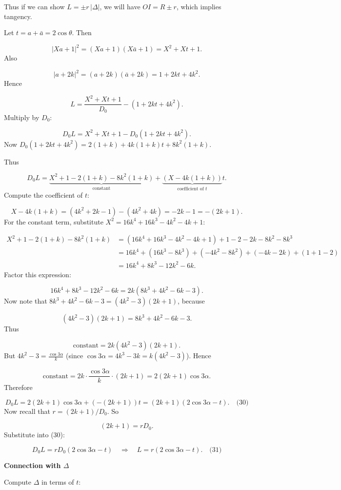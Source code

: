 \documentclass{llmxive}
\providecommand{\solutionheading}[1]{\par\smallskip\noindent\textbf{#1}\par}
\begin{document}
Thus if we can show \(L = \pm r\,|\Delta|\), we will have \(OI = R \pm r\), which implies tangency.\par
Let \(t = a + \bar a = 2\cos\theta\). Then\par
\[
|X a + 1|^2 = (X a + 1)(X \bar a + 1) = X^2 + X t + 1.
\]
Also\par
\[
|a+2k|^2 = (a+2k)(\bar a+2k) = 1 + 2k t + 4k^2.
\]
Hence\par
\[
L = \frac{X^2 + X t + 1}{D_0} - (1 + 2k t + 4k^2).
\]
Multiply by \(D_0\):\par
\[
D_0 L = X^2 + X t + 1 - D_0(1 + 2k t + 4k^2).
\]
Now \(D_0(1 + 2k t + 4k^2) = 2(1+k) + 4k(1+k) t + 8k^2(1+k).\)\par
Thus\par
\[
D_0 L = \underbrace{X^2 + 1 - 2(1+k) - 8k^2(1+k)}_{\text{constant}} + \underbrace{(X - 4k(1+k))}_{\text{coefficient of }t} t.
\]
Compute the coefficient of \(t\):\par
\[
X - 4k(1+k) = (4k^2+2k-1) - (4k^2+4k) = -2k-1 = -(2k+1).
\]
For the constant term, substitute \(X^2 = 16k^4+16k^3-4k^2-4k+1\):\par
\[
\begin{aligned}
X^2 + 1 - 2(1+k) - 8k^2(1+k)
&= (16k^4+16k^3-4k^2-4k+1) + 1 - 2 - 2k - 8k^2 - 8k^3 \\
&= 16k^4 + (16k^3-8k^3) + (-4k^2-8k^2) + (-4k-2k) + (1+1-2) \\
&= 16k^4 + 8k^3 - 12k^2 - 6k.
\end{aligned}
\]
Factor this expression:\par
\[
16k^4 + 8k^3 - 12k^2 - 6k = 2k(8k^3+4k^2-6k-3).
\]
Now note that \(8k^3+4k^2-6k-3 = (4k^2-3)(2k+1)\), because\par
\[
(4k^2-3)(2k+1) = 8k^3+4k^2-6k-3.
\]
Thus\par
\[
\text{constant} = 2k (4k^2-3)(2k+1).
\]
But \(4k^2-3 = \frac{\cos3\alpha}{k}\) (since \(\cos3\alpha = 4k^3-3k = k(4k^2-3)\)). Hence\par
\[
\text{constant} = 2k \cdot \frac{\cos3\alpha}{k} \cdot (2k+1) = 2(2k+1)\cos3\alpha.
\]
Therefore\par
\[
D_0 L = 2(2k+1)\cos3\alpha + (-(2k+1)) t = (2k+1)(2\cos3\alpha - t). \quad\text{(30)}
\]
Now recall that \(r = (2k+1)/D_0\). So\par
\[
(2k+1) = r D_0.
\]
Substitute into (30):\par
\[
D_0 L = r D_0 (2\cos3\alpha - t) \quad\Longrightarrow\quad L = r (2\cos3\alpha - t). \quad\text{(31)}
\]
\solutionheading{Connection with \(\Delta\)}
Compute \(\Delta\) in terms of \(t\):\par
\end{document}
